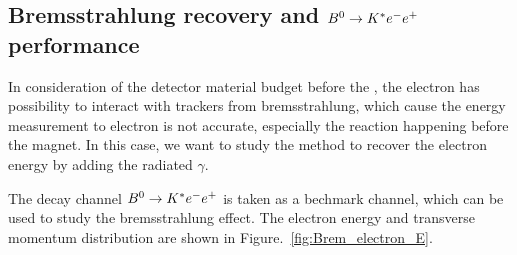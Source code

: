 


\subsection{Bremsstrahlung recovery and ${{B}^0}\rightarrow{\ensuremath{{K}^*}}{\ensuremath{e^-}}{\ensuremath{e^+}}$ performance}

In consideration of the detector material budget before the \ecal,
the electron has possibility to interact with trackers from bremsstrahlung,
which cause the energy measurement to electron is not accurate,
especially the reaction happening before the magnet.
In this case, 
we want to study the method to recover the electron energy by adding the radiated $\gamma$.

The decay channel ${{B}^0}\rightarrow{\ensuremath{{K}^*}}{\ensuremath{e^-}}{\ensuremath{e^+}}$ is taken as a bechmark channel,
which can be used to study the bremsstrahlung effect.
The electron energy and transverse momentum distribution are shown in Figure.~\ref{fig:Brem_electron_E}.

